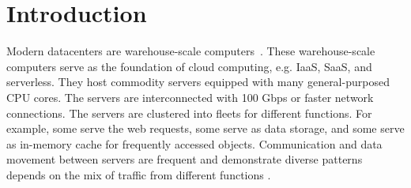 \chapter{Introduction}

Modern datacenters are warehouse-scale computers~\cite{datacenter-as-a-computer:2013}.
%
These warehouse-scale computers serve as the foundation of cloud computing, e.g. IaaS, SaaS, and serverless.
%
They host commodity servers equipped with many general-purposed CPU cores.
%
The servers are interconnected with 100 Gbps or faster network connections.
%
The servers are clustered into fleets for different functions. For example, some serve the web requests, some serve as data storage, and some serve as in-memory cache for frequently accessed objects.
%
Communication and data movement between servers are frequent and demonstrate diverse patterns depends on the mix of traffic from different functions .

